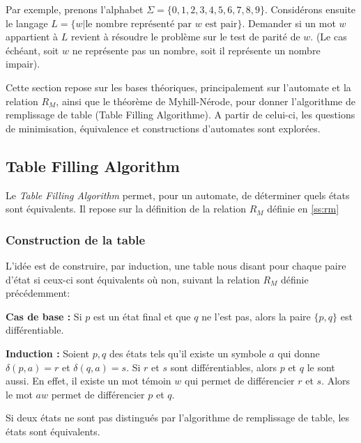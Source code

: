 	 Par exemple, prenons l'alphabet $\Sigma=\{0,1,2,3,4,5,6,7,8,9\}$. Considérons ensuite le langage $L = \{w | \text{le nombre représenté par } w \text{ est pair}\}$.
	 Demander si un mot $w$ appartient à $L$ revient à résoudre le problème sur le test de parité de $w$. (Le cas échéant, soit $w$ ne représente pas un nombre, soit il représente un nombre impair).
	 
	 
	 Cette section repose sur les bases théoriques, principalement sur l'automate et la relation $R_M$, ainsi que le théorème de Myhill-Nérode, pour donner l'algorithme de remplissage de table (Table Filling Algorithme). A partir de celui-ci, les questions de minimisation, équivalence et constructions d'automates sont explorées.
	 
	 
	 \subsection{Table Filling Algorithm}\label{ss:tfa}
	 
	 Le \emph{Table Filling Algorithm} permet, pour un automate, de déterminer quels états sont équivalents. Il repose sur la définition de la relation $R_M$ définie en \ref{ss:rm}
	 
	 \subsubsection{Construction de la table}
	 
	 L'idée est de construire, par induction, une table nous disant pour chaque paire d'état si ceux-ci sont équivalents où non, suivant la relation $R_M$ définie précédemment:
	 
	 \textbf{Cas de base :} Si $p$ est un état final et que $q$ ne l'est pas, alors la paire $\{p,q\}$ est différentiable.
	 
	 \textbf{Induction : } Soient $p,q$ des états tels qu'il existe un symbole $a$ qui donne $\delta(p,a)=r$ et $\delta(q,a)=s$. Si $r$ et $s$ sont différentiables, alors $p$ et $q$ le sont aussi. En effet, il existe un mot témoin $w$ qui permet de différencier $r$ et $s$. Alors le mot $aw$ permet de différencier $p$ et $q$.
	 
	 \begin{theorem}
	 	Si deux états ne sont pas distingués par l'algorithme de remplissage de table, les états sont équivalents.
	 \end{theorem}
	 
